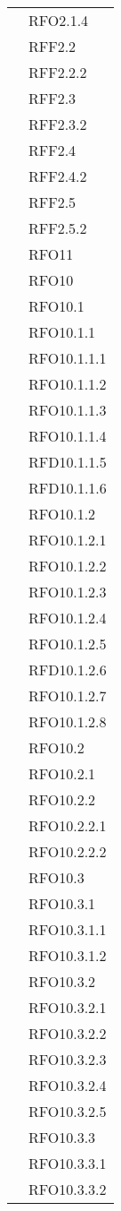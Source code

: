 \begin{longtable}{ p{12cm} | p{4cm} }
		    & RFO2.1.4 \\
		    & RFF2.2 \\
		    & RFF2.2.2 \\
		    & RFF2.3 \\
		    & RFF2.3.2 \\
		    & RFF2.4 \\
		    & RFF2.4.2 \\
		    & RFF2.5 \\
		    & RFF2.5.2 \\
		    & RFO11 \\
		    & RFO10 \\
& RFO10.1 \\
& RFO10.1.1 \\
& RFO10.1.1.1 \\
& RFO10.1.1.2 \\
& RFO10.1.1.3 \\
& RFO10.1.1.4 \\
& RFD10.1.1.5 \\
& RFD10.1.1.6 \\
& RFO10.1.2 \\
& RFO10.1.2.1 \\
& RFO10.1.2.2 \\
& RFO10.1.2.3 \\
& RFO10.1.2.4 \\
& RFO10.1.2.5 \\
& RFD10.1.2.6 \\
& RFO10.1.2.7 \\
& RFO10.1.2.8 \\
& RFO10.2 \\
& RFO10.2.1 \\
& RFO10.2.2 \\
& RFO10.2.2.1 \\
& RFO10.2.2.2 \\
& RFO10.3 \\
& RFO10.3.1 \\
& RFO10.3.1.1 \\
& RFO10.3.1.2 \\
& RFO10.3.2 \\
& RFO10.3.2.1 \\
& RFO10.3.2.2 \\
& RFO10.3.2.3 \\
& RFO10.3.2.4 \\
& RFO10.3.2.5 \\
& RFO10.3.3 \\
& RFO10.3.3.1 \\
& RFO10.3.3.2 \\

\end{longtable}
